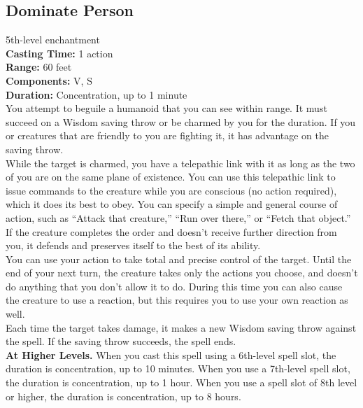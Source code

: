 \documentclass[11pt, A4paper, english]{article}
\begin{document}
		\subsection{Dominate Person}
5th-level enchantment \\
\textbf{Casting Time:} 1 action \\
\textbf{Range:} 60 feet \\
\textbf{Components:} V, S \\
\textbf{Duration:} Concentration, up to 1 minute \\
You attempt to beguile a humanoid that you can see within range. It must succeed on a Wisdom saving throw or be charmed by you for the duration. If you or creatures that are friendly to you are fighting it, it has advantage on the saving throw. \\
While the target is charmed, you have a telepathic link with it as long as the two of you are on the same plane of existence. You can use this telepathic link to issue commands to the creature while you are conscious (no action required), which it does its best to obey. You can specify a simple and general course of action, such as “Attack that creature,” “Run over there,” or “Fetch that object.” If the creature completes the order and doesn’t receive further direction from you, it defends and preserves itself to the best of its ability. \\
You can use your action to take total and precise control of the target. Until the end of your next turn, the creature takes only the actions you choose, and doesn’t do anything that you don’t allow it to do. During this time you can also cause the creature to use a reaction, but this requires you to use your own reaction as well. \\
Each time the target takes damage, it makes a new Wisdom  saving throw against the spell. If the saving throw succeeds, the spell ends. \\
\textbf{At Higher Levels.} When you cast this spell using a 6th-level spell slot, the duration is concentration, up to 10 minutes. When you use a 7th-level spell slot, the duration is concentration, up to 1 hour. When you use a spell slot of 8th level or higher, the duration is concentration, up to 8 hours.
\end{document}
